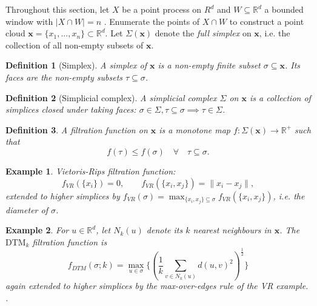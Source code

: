 \documentclass[11pt,a4paper]{article}
\newcommand{\R}{\mathbb{R}}
\newcommand{\pc}{\mathbf{x}}
\newcommand{\simpcom}{\Sigma}
\theoremstyle{definitioncolon}
\newtheorem{definition}{Definition}[section]
\newtheorem*{example}{Example}
\begin{document}
Throughout this section, let $X$ be a point process on $R^d$ and $W \subseteq \R^d$ a bounded window with
$|X \cap W| = n$ . Enumerate the points of $X \cap W$ to construct a point cloud
$\pc = \{x_1, ..., x_n\} \subset \R^d$. Let $\Sigma(\pc)$ denote the \emph{full
simplex} on $\pc$, i.e. the collection of all non-empty subsets of $\pc$.

    \begin{definition}[Simplex]
    \label{def:simplex}
        A \emph{simplex} of $\pc$ is a non-empty finite subset
        $\sigma \subseteq \pc$. Its faces are the non-empty subsets
        $\tau \subseteq \sigma$.
    \end{definition}

    \begin{definition}[Simplicial complex]
    \label{def:simpcomplex}
        A simplicial complex $\simpcom$ on $\pc$ is a collection of simplices
        closed under taking faces: $\sigma \in \simpcom, \tau \subseteq \sigma
        \implies \tau \in \simpcom$.
    \end{definition}

    \begin{definition}
    \label{def:filtfunc}
        A filtration function on $\pc$ is a monotone map
        $f: \Sigma(\pc) \rightarrow \R^+$ such that
            \[
            f(\tau) \leq f(\sigma) \quad \forall \quad \tau \subseteq \sigma.
            \]
    \end{definition}

    \begin{example}
        Vietoris-Rips filtration function:
            \[
            f_{VR}(\{x_i\}) = 0, \qquad f_{VR}(\{x_i, x_j\}) = \|x_i - x_j\|,
            \]
        extended to higher simplices by $f_{VR}(\sigma) = \max_{\{x_i,x_j\}
        \subseteq \sigma} f_{VR}(\{x_i, x_j\})$, i.e. the diameter of $\sigma$.
    \end{example}

    \begin{example}
    \label{ex:dtm}
        For $u \in \R^d$, let $N_k(u)$ denote its $k$ nearest neighbours in
        $\pc$. The $\mathrm{DTM}_k$ filtration function is
            \[
            f_{DTM}(\sigma; k) = \max_{u \in \sigma}\{(\frac{1}{k}
            \sum_{v \in N_k(u)} d(u, v)^2)^{\frac{1}{2}}\}
            \]
        again extended to higher simplices by the max-over-edges rule of the VR
        example. \citep{anai2020dtm}.
    \end{example}
\end{document}
